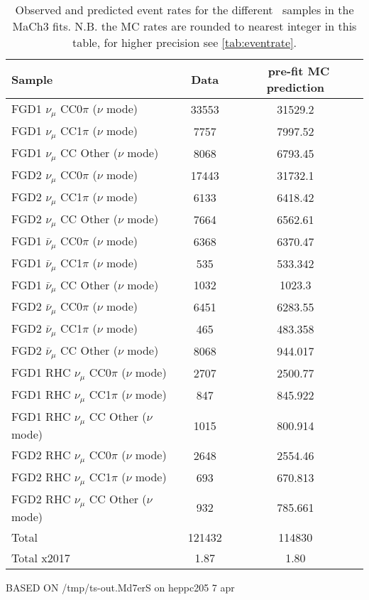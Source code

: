 \begin{table}[htbp]
	\centering
	\begin{tabular}{ l c c }
		\hline
		Sample & Data & \nd~pre-fit MC prediction \\ \hline
		\hline
		FGD1 $\nu_{\mu}$ CC0$\pi$ ($\nu$ mode)                  & 33553 & 31529.2    \\%
		FGD1 $\nu_{\mu}$ CC1$\pi$ ($\nu$ mode)                  & 7757  & 7997.52  \\%
		FGD1 $\nu_{\mu}$ CC Other ($\nu$ mode)                  & 8068  & 6793.45  \\%
		\hline
		FGD2 $\nu_{\mu}$ CC0$\pi$ ($\nu$ mode)                  & 17443 & 31732.1 \\%
		FGD2 $\nu_{\mu}$ CC1$\pi$ ($\nu$ mode)                  & 6133  & 6418.42  \\%
		FGD2 $\nu_{\mu}$ CC Other ($\nu$ mode)                  & 7664  & 6562.61  \\%
		\hline
		FGD1 $\bar{\nu}_{\mu}$ CC0$\pi$ ($\nu$ mode)            & 6368 & 6370.47    \\%
		FGD1 $\bar{\nu}_{\mu}$ CC1$\pi$ ($\nu$ mode)            & 535  & 533.342  \\%
		FGD1 $\bar{\nu}_{\mu}$ CC Other ($\nu$ mode)            & 1032 & 1023.3  \\%
		\hline
		FGD2 $\bar{\nu}_{\mu}$ CC0$\pi$ ($\nu$ mode)            & 6451 & 6283.55    \\%
		FGD2 $\bar{\nu}_{\mu}$ CC1$\pi$ ($\nu$ mode)            & 465  & 483.358  \\%
		FGD2 $\bar{\nu}_{\mu}$ CC Other ($\nu$ mode)            & 8068 & 944.017  \\%
		\hline
		FGD1 RHC $\nu_{\mu}$ CC0$\pi$ ($\nu$ mode)              & 2707 & 2500.77  \\%
		FGD1 RHC $\nu_{\mu}$ CC1$\pi$ ($\nu$ mode)              & 847  & 845.922 \\%
		FGD1 RHC $\nu_{\mu}$ CC Other ($\nu$ mode)              & 1015 & 800.914  \\%
		\hline
		FGD2 RHC $\nu_{\mu}$ CC0$\pi$ ($\nu$ mode)              & 2648 & 2554.46  \\%
		FGD2 RHC $\nu_{\mu}$ CC1$\pi$ ($\nu$ mode)              & 693  & 670.813  \\%
		FGD2 RHC $\nu_{\mu}$ CC Other ($\nu$ mode)              & 932  & 785.661 \\%
		Total & 121432 & 114830 \\
		Total x2017 & 1.87 & 1.80 \\
		\hline
	\end{tabular}
	\caption{Observed and predicted event rates for the different \nd~samples in the MaCh3 fits. N.B. the MC rates are rounded to nearest integer in this table, for higher precision see \autoref{tab:eventrate}.}
	\label{tab:detailed_eventrate_2018}
\end{table}
BASED ON /tmp/ts-out.Md7erS on heppc205 7 apr


